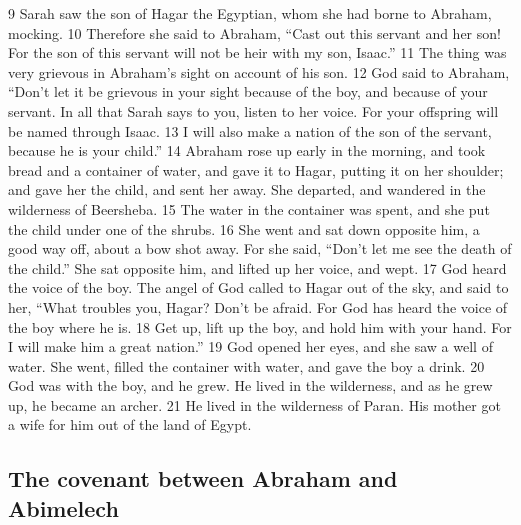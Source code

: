 {9} Sarah saw the son of Hagar the Egyptian, whom she had borne to
Abraham, mocking. {10} Therefore she said to Abraham, ``Cast out this
servant and her son! For the son of this servant will not be heir with
my son, Isaac.'' {11} The thing was very grievous in Abraham's sight on
account of his son. {12} God said to Abraham, ``Don't let it be grievous
in your sight because of the boy, and because of your servant. In all
that Sarah says to you, listen to her voice. For your offspring will be
named through Isaac. {13} I will also make a nation of the son of the
servant, because he is your child.'' {14} Abraham rose up early in the
morning, and took bread and a container of water, and gave it to Hagar,
putting it on her shoulder; and gave her the child, and sent her away.
She departed, and wandered in the wilderness of Beersheba. {15} The
water in the container was spent, and she put the child under one of the
shrubs. {16} She went and sat down opposite him, a good way off, about a
bow shot away. For she said, ``Don't let me see the death of the
child.'' She sat opposite him, and lifted up her voice, and wept. {17}
God heard the voice of the boy. The angel of God called to Hagar out of
the sky, and said to her, ``What troubles you, Hagar? Don't be afraid.
For God has heard the voice of the boy where he is. {18} Get up, lift up
the boy, and hold him with your hand. For I will make him a great
nation.'' {19} God opened her eyes, and she saw a well of water. She
went, filled the container with water, and gave the boy a drink. {20}
God was with the boy, and he grew. He lived in the wilderness, and as he
grew up, he became an archer. {21} He lived in the wilderness of Paran.
His mother got a wife for him out of the land of Egypt.

\hypertarget{the-covenant-between-abraham-and-abimelech}{%
\subsection{The covenant between Abraham and
Abimelech}\label{the-covenant-between-abraham-and-abimelech}}

